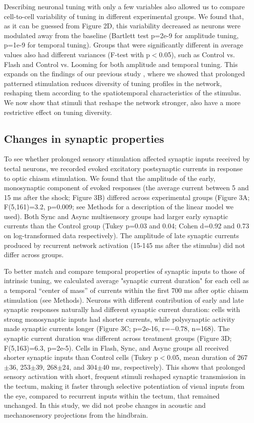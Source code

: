 \documentclass{article}
\begin{document}
Describing neuronal tuning with only a few variables also allowed us to compare cell-to-cell variability of tuning in different experimental groups. We found that, as it can be guessed from Figure 2D, this variability decreased as neurons were modulated away from the baseline (Bartlett test p=2e-9 for amplitude tuning, p=1e-9 for temporal tuning). Groups that were significantly different in average values also had different variances (F-test with p$<$0.05), such as Control vs. Flash and Control vs. Looming for both amplitude and temporal tuning. This expands on the findings of our previous study \citep{ciarleglio2015}, where we showed that prolonged patterned stimulation reduces diversity of tuning profiles in the network, reshaping them according to the spatiotemporal characteristics of the stimulus. We now show that stimuli that reshape the network stronger, also have a more restrictive effect on tuning diversity.

\subsection*{Changes in synaptic properties}

To see whether prolonged sensory stimulation affected synaptic inputs received by tectal neurons, we recorded evoked excitatory postsynaptic currents in response to optic chiasm stimulation. We found that the amplitude of the early, monosynaptic component of evoked responses (the average current between 5 and 15 ms after the shock; Figure 3B) differed across experimental groups (Figure 3A; F(5,161)=3.2, p=0.009; see Methods for a description of the linear model we used). Both Sync and Async multisensory groups had larger early synaptic currents than the Control group (Tukey p=0.03 and 0.04; Cohen d=0.92 and 0.73 on log-transformed data respectively). The amplitude of late synaptic currents produced by recurrent network activation (15-145 ms after the stimulus) did not differ across groups.

To better match and compare temporal properties of synaptic inputs to those of intrinsic tuning, we calculated average "synaptic current duration" for each cell as a temporal “center of mass” of currents within the first 700 ms after optic chiasm stimulation (see Methods). Neurons with different contribution of early and late synaptic responses naturally had different synaptic current duration: cells with strong monosynaptic inputs had shorter currents, while polysynaptic activity made synaptic currents longer (Figure 3C; p=2e-16, r=$-$0.78, n=168). The synaptic current duration was different across treatment groups (Figure 3D; F(5,163)=6.3, p=2e-5). Cells in Flash, Sync, and Async groups all received shorter synaptic inputs than Control cells (Tukey p$<$0.05, mean duration of 267$\pm$36, 253$\pm$39, 268$\pm$24, and 304$\pm$40 ms, respectively). This shows that prolonged sensory activation with short, frequent stimuli reshaped synaptic transmission in the tectum, making it faster through selective potentiation of visual inputs from the eye, compared to recurrent inputs within the tectum, that remained unchanged. In this study, we did not probe changes in acoustic and mechanosensory projections from the hindbrain.
\end{document}
